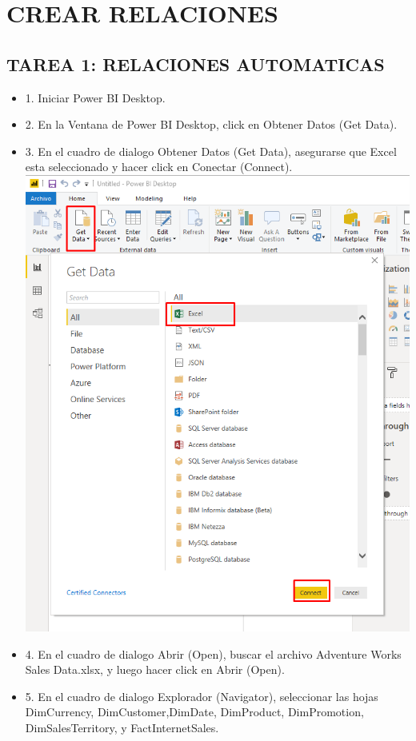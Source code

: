 \section{CREAR RELACIONES} 
\subsection {TAREA 1:  RELACIONES AUTOMATICAS}

\begin{itemize}

\item 1. Iniciar Power BI Desktop.
\item 2. En la Ventana de Power BI Desktop, click en Obtener Datos (Get Data).
\item 3. En el cuadro de dialogo Obtener Datos (Get Data), asegurarse que Excel esta seleccionado y hacer click en Conectar (Connect). \\
\includegraphics[scale=0.5]{./Imagenes/image001}
\item 4. En el cuadro de dialogo Abrir (Open), buscar el archivo Adventure Works Sales Data.xlsx, y luego hacer click en Abrir (Open).
\item 5. En el cuadro de dialogo Explorador (Navigator), seleccionar las hojas DimCurrency, DimCustomer,DimDate, DimProduct, DimPromotion, DimSalesTerritory, y FactInternetSales.

\end{itemize}
